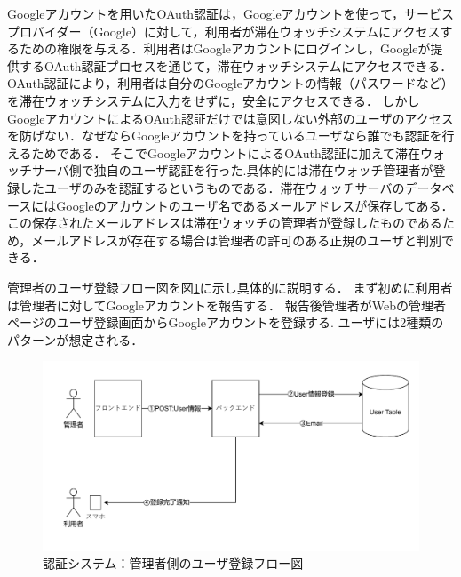 Googleアカウントを用いたOAuth認証は，Googleアカウントを使って，サービスプロバイダー（Google）に対して，利用者が滞在ウォッチシステムにアクセスするための権限を与える．利用者はGoogleアカウントにログインし，Googleが提供するOAuth認証プロセスを通じて，滞在ウォッチシステムにアクセスできる．
OAuth認証により，利用者は自分のGoogleアカウントの情報（パスワードなど）を滞在ウォッチシステムに入力をせずに，安全にアクセスできる．
しかしGoogleアカウントによるOAuth認証だけでは意図しない外部のユーザのアクセスを防げない．なぜならGoogleアカウントを持っているユーザなら誰でも認証を行えるためである．
そこでGoogleアカウントによるOAuth認証に加えて滞在ウォッチサーバ側で独自のユーザ認証を行った.具体的には滞在ウォッチ管理者が登録したユーザのみを認証するというものである．滞在ウォッチサーバのデータベースにはGoogleのアカウントのユーザ名であるメールアドレスが保存してある．この保存されたメールアドレスは滞在ウォッチの管理者が登録したものであるため，メールアドレスが存在する場合は管理者の許可のある正規のユーザと判別できる．



管理者のユーザ登録フロー図を図\ref{fig:registerUser}に示し具体的に説明する．
まず初めに利用者は管理者に対してGoogleアカウントを報告する．
報告後管理者がWebの管理者ページのユーザ登録画面からGoogleアカウントを登録する.
ユーザには2種類のパターンが想定される．

\begin{figure}[h]
  \centering  %
  \includegraphics[clip,scale = 0.8]{image/registerUser.pdf}
  \caption{認証システム：管理者側のユーザ登録フロー図}    \label{fig:registerUser}
\end{figure}



